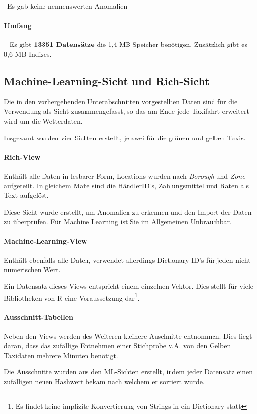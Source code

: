 ~\newline Es gab keine nennenswerten Anomalien. 
\paragraph{Umfang} ~\newline
Es gibt \textbf{13351 Datensätze} die 1,4 MB Speicher benötigen. Zusätzlich gibt es 0,6 MB Indizes.

\subsection{Machine-Learning-Sicht und Rich-Sicht}
Die in den vorhergehenden Unterabschnitten vorgestellten Daten sind für die Verwendung als Sicht zusammengefasst, so das am Ende jede Taxifahrt erweitert wird um die Wetterdaten. 

Insgesamt wurden vier Sichten erstellt, je zwei für die grünen und gelben Taxis:

\paragraph{Rich-View}
Enthält alle Daten in lesbarer Form, Locations wurden nach \textit{Borough} und \textit{Zone} aufgeteilt. In gleichem Maße sind die HändlerID's, Zahlungsmittel und Raten als Text aufgelöst.

Diese Sicht wurde erstellt, um Anomalien zu erkennen und den Import der Daten zu überprüfen. Für Machine Learning ist Sie im Allgemeinen Unbrauchbar. 

\paragraph{Machine-Learning-View}
Enthält ebenfalls alle Daten, verwendet allerdings Dictionary-ID's für jeden nicht-numerischen Wert. 

Ein Datensatz dieses Views entspricht einem einzelnen Vektor. Dies stellt für viele Bibliotheken von R eine Voraussetzung dar\footnote{Es findet keine implizite Konvertierung von Strings in ein Dictionary statt}.

\paragraph{Ausschnitt-Tabellen}
Neben den Views werden des Weiteren kleinere Auschnitte entnommen. Dies liegt daran, dass das zufällige Entnehmen einer Stichprobe v.A. von den Gelben Taxidaten mehrere Minuten benötigt. 

Die Ausschnitte wurden aus den ML-Sichten erstellt, indem jeder Datensatz einen zufälligen neuen Hashwert bekam nach welchem er sortiert wurde. 